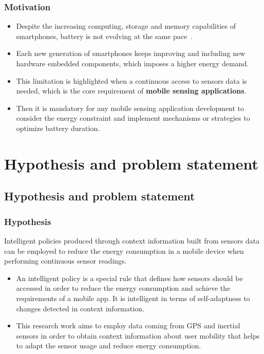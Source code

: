 \documentclass[compress,9pt,xcolor={dvipsnames,table}]{beamer}
\begin{document}
\begin{frame}\frametitle{Motivation}
\begin{itemize}
	\item Despite the increasing computing, storage and memory capabilities of smartphones, battery is not evolving at the same pace~\cite{Kjaergaard2012}.
	\item Each new generation of smartphones keeps improving and including new hardware embedded components, which imposes a higher energy demand.
	\item This limitation is highlighted when a continuous access to sensors data is needed, which is the core requirement of \textbf{mobile sensing applications}.
	\item Then it is mandatory for any mobile sensing application development to consider the energy constraint and implement mechanisms or strategies to optimize battery duration.

\end{itemize}
\end{frame}


\section{Hypothesis and problem statement}
\subsection{Hypothesis and problem statement}
\begin{frame}\frametitle{Hypothesis}
\begin{tcolorbox}[title=Hypothesis,colframe=PineGreen]
Intelligent policies produced through context information built from sensors data can be employed to reduce the energy consumption in a mobile device when performing continuous sensor readings.
\end{tcolorbox}

{
\small
\begin{itemize}
	\item An intelligent policy is a special rule that defines how sensors should be accessed in order to reduce the energy consumption and achieve the requirements of a mobile app.
	It is intelligent in terms of self-adaptness to changes detected in context information.
	\item This research work aims to employ data coming from GPS and inertial sensors in order to obtain context information about user mobility that helps to adapt the sensor usage and reduce energy consumption.
\end{itemize}
}
\end{frame}
\end{document}
